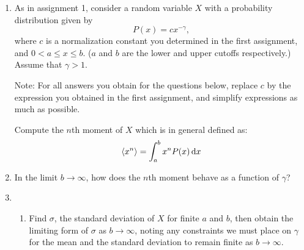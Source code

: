 \begin{enumerate}





\item 

  As in assignment 1, consider a random variable $X$ with 
  a probability distribution given by
  $$
  P(x) = c x^{-\gamma},
  $$
  where $c$ is a normalization constant you determined in the first assignment,
  and $0 < a \le x \le b $.
  ($a$ and $b$ are the lower and upper cutoffs respectively.)
  Assume that $\gamma > 1$.

  Note: For all answers you obtain for the questions below,
  replace $c$ by the expression you obtained in the first assignment, and simplify
  expressions as much as possible.
  
  Compute the $n$th moment of $X$ which is in general
  defined as:
  $$
  \langle x^n\rangle
  = 
  \int_{a}^{b} x^n P(x) \,\mbox{d}x
  $$


  
   \solutionstart


   \solutionend

\item

  In the limit $b \rightarrow \infty$, how does the $n$th moment
  behave as a function of $\gamma$?

  
   \solutionstart


   \solutionend


\item
  \begin{enumerate}
  \item 
    Find $\sigma$, the standard deviation of $X$
    for finite $a$ and $b$, then obtain the limiting form
    of $\sigma$ as $b \rightarrow \infty$,
    noting any
    constraints we must place on $\gamma$
    for the mean and the standard deviation
    to remain finite
    as $b \rightarrow \infty$.


\end{enumerate}
\end{enumerate}

